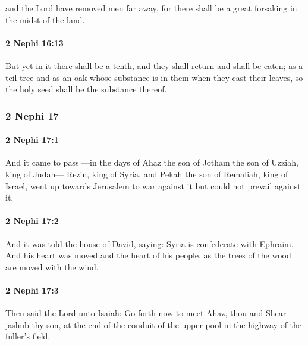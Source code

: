 			and the Lord have removed men far away,
			for there shall be a great forsaking in the midst of the land.

		\paragraph{2 Nephi 16:13} %
			\label{2NEPHI-16-13}

			But yet in it there shall be a tenth,
			and they shall return and shall be eaten;
			as a teil tree and as an oak
			whose substance is in them when they cast their leaves,
			so the holy seed shall be the substance thereof.

	\subsubsection{2 Nephi 17} %
		\label{2NEPHI-17}
		
		\paragraph{2 Nephi 17:1} %
			\label{2NEPHI-17-1}

			And it came to pass
			---in the days of Ahaz the son of Jotham the son of Uzziah, king of Judah---
			Rezin, king of Syria, and Pekah the son of Remaliah, king of Israel, went up
			towards Jerusalem to war against it but could not prevail against it.

		\paragraph{2 Nephi 17:2} %
			\label{2NEPHI-17-2}

			And it was told the house of David, saying:
			Syria is confederate with Ephraim.
			And his heart was moved and the heart of his people,
			as the trees of the wood are moved with the wind.

		\paragraph{2 Nephi 17:3} %
			\label{2NEPHI-17-3}

			Then said the Lord unto Isaiah:
			Go forth now to meet Ahaz,
			thou and Shear-jashub thy son,
			at the end of the conduit of the upper pool
			in the highway of the fuller's field,

